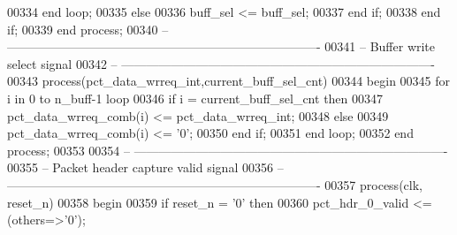 \begin{DoxyCode}
00334          \textcolor{keywordflow}{end} \textcolor{keywordflow}{loop};
00335       \textcolor{keywordflow}{else}    
00336          \textcolor{vhdlchar}{buff_sel}  \textcolor{vhdlchar}{<=} \textcolor{vhdlchar}{buff_sel};
00337       \textcolor{keywordflow}{end} \textcolor{keywordflow}{if};
00338    \textcolor{keywordflow}{end} \textcolor{keywordflow}{if};
00339 \textcolor{keywordflow}{end} \textcolor{keywordflow}{process};
00340 \textcolor{keyword}{-- ----------------------------------------------------------------------------}
00341 \textcolor{keyword}{-- Buffer write select signal }
00342 \textcolor{keyword}{-- ----------------------------------------------------------------------------}
00343 \textcolor{keywordflow}{process}(pct_data_wrreq_int,current_buff_sel_cnt)
00344 \textcolor{vhdlkeyword}{begin}
00345    \textcolor{keywordflow}{for} \textcolor{vhdlchar}{i} \textcolor{keywordflow}{in} \textcolor{vhdllogic}{}\textcolor{vhdllogic}{0} \textcolor{keywordflow}{to} \textcolor{vhdlchar}{n_buff}\textcolor{vhdlchar}{-}\textcolor{vhdllogic}{}\textcolor{vhdllogic}{1} \textcolor{keywordflow}{loop}
00346       \textcolor{keywordflow}{if} \textcolor{vhdlchar}{i} \textcolor{vhdlchar}{=} \textcolor{vhdlchar}{current_buff_sel_cnt} \textcolor{keywordflow}{then} 
00347          \textcolor{vhdlchar}{pct_data_wrreq_comb}\textcolor{vhdlchar}{(}\textcolor{vhdlchar}{i}\textcolor{vhdlchar}{)} \textcolor{vhdlchar}{<=} \textcolor{vhdlchar}{pct_data_wrreq_int};
00348       \textcolor{keywordflow}{else} 
00349          \textcolor{vhdlchar}{pct_data_wrreq_comb}\textcolor{vhdlchar}{(}\textcolor{vhdlchar}{i}\textcolor{vhdlchar}{)} \textcolor{vhdlchar}{<=} \textcolor{vhdlchar}{'}\textcolor{vhdllogic}{}\textcolor{vhdllogic}{0}\textcolor{vhdlchar}{'};
00350       \textcolor{keywordflow}{end} \textcolor{keywordflow}{if};
00351    \textcolor{keywordflow}{end} \textcolor{keywordflow}{loop};
00352 \textcolor{keywordflow}{end} \textcolor{keywordflow}{process};
00353 
00354 \textcolor{keyword}{-- ----------------------------------------------------------------------------}
00355 \textcolor{keyword}{-- Packet header capture valid signal }
00356 \textcolor{keyword}{-- ----------------------------------------------------------------------------}
00357 \textcolor{keywordflow}{process}(clk, reset_n)
00358 \textcolor{vhdlkeyword}{begin}
00359    \textcolor{keywordflow}{if} \textcolor{vhdlchar}{reset_n} \textcolor{vhdlchar}{=} \textcolor{vhdlchar}{'}\textcolor{vhdllogic}{}\textcolor{vhdllogic}{0}\textcolor{vhdlchar}{'} \textcolor{keywordflow}{then} 
00360       \textcolor{vhdlchar}{pct_hdr_0_valid} \textcolor{vhdlchar}{<=} \textcolor{vhdlchar}{(}\textcolor{keywordflow}{others}\textcolor{vhdlchar}{=}\textcolor{vhdlchar}{>}\textcolor{vhdlchar}{'}\textcolor{vhdllogic}{}\textcolor{vhdllogic}{0}\textcolor{vhdlchar}{'}\textcolor{vhdlchar}{)};

\end{DoxyCode}
